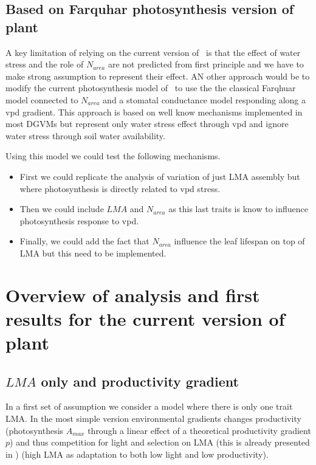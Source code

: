 \documentclass[a4paper,11pt]{article}
\begin{document}
\subsection{Based on Farquhar photosynthesis version of plant}

A key limitation of relying on the current version of \plant\ is that the effect of water stress and the role of $N_{area}$ are not predicted from first principle and we have to make strong assumption to represent their effect. AN other approach would be to modify the current photosynthesis model of \plant\ to use the
  the classical Farqhuar model connected to $N_{area}$ and a stomatal
  conductance model responding along a vpd gradient. This approach
  is based on well know mechanisms implemented in most DGVMs but
  represent only water stress effect through vpd and ignore water stress through soil water availability.

Using this model we could test the following mechanisms.

\begin{itemize}

\item First we could replicate the analysis of variation of just LMA assembly but where photosynthesis is directly related to vpd stress.

\item Then we could include $LMA$ and $N_{area}$ as this last traits is know to influence photosynthesis response to vpd.

\item Finally, we could add the fact that $N_{area}$ influence the leaf lifespan on top of LMA but this need to be implemented.

\end{itemize}



\section{Overview of analysis and first results for the current version of plant}


\subsection{$LMA$ only and productivity gradient}

In a first set of assumption we consider a model where there is only one trait LMA. In the most simple version environmental gradients changes productivity (photosynthesis $A_{max}$ through a linear effect of a theoretical productivity gradient $p$) and
thus competition for light and selection on LMA (this is already presented in \citet{Falster-2017}) (high LMA as adaptation to both low light and low productivity).
\end{document}
